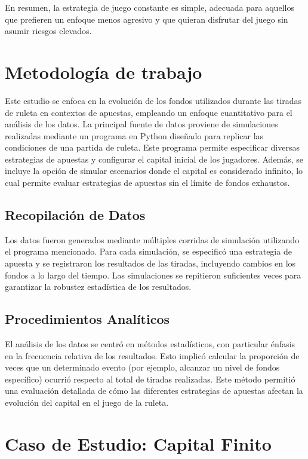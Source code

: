 \documentclass{article}
\begin{document}
En resumen, la estrategia de juego constante es simple, adecuada para aquellos que prefieren un enfoque menos agresivo y que quieran disfrutar del juego sin asumir riesgos elevados.

\section{Metodología de trabajo}
Este estudio se enfoca en la evolución de los fondos utilizados durante las tiradas de ruleta en contextos de apuestas, empleando un enfoque cuantitativo para el análisis de los datos. La principal fuente de datos proviene de simulaciones realizadas mediante un programa en Python diseñado para replicar las condiciones de una partida de ruleta. Este programa permite especificar diversas estrategias de apuestas y configurar el capital inicial de los jugadores. Además, se incluye la opción de simular escenarios donde el capital es considerado infinito, lo cual permite evaluar estrategias de apuestas sin el límite de fondos exhaustos.

\subsection{Recopilación de Datos}
Los datos fueron generados mediante múltiples corridas de simulación utilizando el programa mencionado. Para cada simulación, se especificó una estrategia de apuesta y se registraron los resultados de las tiradas, incluyendo cambios en los fondos a lo largo del tiempo. Las simulaciones se repitieron suficientes veces para garantizar la robustez estadística de los resultados.


\subsection{Procedimientos Analíticos}
El análisis de los datos se centró en métodos estadísticos, con particular énfasis en la frecuencia relativa de los resultados. Esto implicó calcular la proporción de veces que un determinado evento (por ejemplo, alcanzar un nivel de fondos específico) ocurrió respecto al total de tiradas realizadas. Este método permitió una evaluación detallada de cómo las diferentes estrategias de apuestas afectan la evolución del capital en el juego de la ruleta.


\section{Caso de Estudio: Capital Finito}
\end{document}
